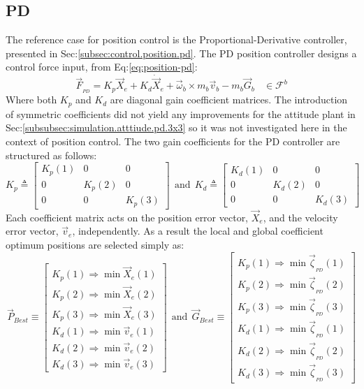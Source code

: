 \subsection{PD}
\label{subsec:simulation.position.pd}
The reference case for position control is the Proportional-Derivative controller, presented in Sec:\ref{subsec:control.position.pd}. The PD position controller designs a control force input, from Eq:\ref{eq:position-pd}:
\begin{equation}
\vec{F}_{_{PD}}=K_p\vec{X}_e + K_d\dot{\vec{X}}_e + \vec{\omega}_b\times m_b\vec{v}_b-m_b\vec{G}_b~~~~\in\mathcal{F}^{b}
\end{equation}
Where both $K_p$ and $K_d$ are diagonal gain coefficient matrices. The introduction of symmetric coefficients did not yield any improvements for the attitude plant in Sec:\ref{subsubsec:simulation.atttiude.pd.3x3} so it was not investigated here in the context of position control. The two gain coefficients for the PD controller are structured as follows:
\begin{equation}\label{eq:simulation-attitde-pd-diagonal-coefficients}
K_p\triangleq \begin{bmatrix}
K_p(1) & 0 & 0\\
0 & K_p(2) & 0\\
0 & 0 & K_p(3)
\end{bmatrix}
~~\text{and}~~K_d\triangleq \begin{bmatrix}
K_d(1) & 0 & 0\\
0 & K_d(2) & 0\\
0 & 0 & K_d(3)
\end{bmatrix}
\end{equation}
Each coefficient matrix acts on the position error vector, $\vec{X}_e$, and the velocity error vector, $\vec{v}_e$, independently. As a result the local and global coefficient optimum positions are selected simply as:
\begin{equation}
\vec{P}_{Best}\equiv
\begin{bmatrix}
K_p(1)\Rightarrow \min \vec{X}_e(1)\\
K_p(2)\Rightarrow \min \vec{X}_e(2)\\
K_p(3)\Rightarrow \min \vec{X}_e(3)\\
K_d(1)\Rightarrow \min \vec{v}_e(1)\\
K_d(2)\Rightarrow \min \vec{v}_e(2)\\
K_d(3)\Rightarrow \min \vec{v}_e(3)
\end{bmatrix}~~\text{and}~~\vec{G}_{Best}\equiv\begin{bmatrix}
K_p(1)\Rightarrow \min \vec{\zeta}_{_{PD}}(1)\\
K_p(2)\Rightarrow \min \vec{\zeta}_{_{PD}}(2)\\
K_p(3)\Rightarrow \min \vec{\zeta}_{_{PD}}(3)\\
K_d(1)\Rightarrow \min \vec{\zeta}_{_{PD}}(1)\\
K_d(2)\Rightarrow \min \vec{\zeta}_{_{PD}}(2)\\
K_d(3)\Rightarrow \min \vec{\zeta}_{_{PD}}(3)
\end{bmatrix}
\end{equation}
